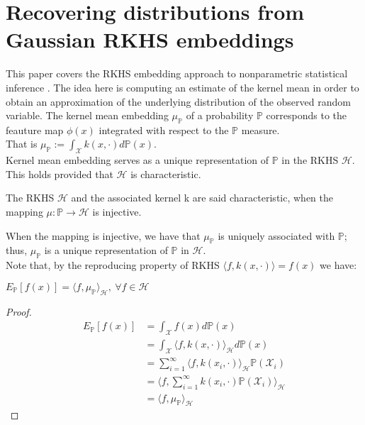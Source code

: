 \section{Recovering distributions from Gaussian RKHS embeddings}
This paper covers the RKHS embedding approach to nonparametric statistical inference \cite{pmlr}.
The idea here is computing an estimate of the kernel mean in order to obtain an approximation of the underlying distribution of the observed random variable.
The kernel mean embedding $\mu_{\mathbb{P}}$ of a probability $\mathbb{P}$ corresponds to the feauture map $\phi(x)$ integrated with respect to the $\mathbb{P}$ measure.
\\
That is $\mu_{\mathbb{P}}:=\int_{\mathcal{X}}k(x,\cdot)d\mathbb{P}(x)$.
\\
Kernel mean embedding serves as a unique representation of $\mathbb{P}$ in the RKHS $\mathcal{H}$. This holds provided  that $\mathcal{H}$ is characteristic. 
\begin{definition}
The RKHS $\mathcal{H}$ and the associated kernel k are said characteristic, when the mapping $\mu : \mathbb{P} \rightarrow \mathcal{H}$ is injective.
\end{definition}
When the mapping is injective, we have that $\mu_{\mathbb{P}}$ is uniquely associated with $\mathbb{P}$; thus, $\mu_{\mathbb{P}}$ is a unique representation of $\mathbb{P}$ in $\mathcal{H}$. 
\\
Note that, by the reproducing property of RKHS $\langle f, k(x,\cdot) \rangle=f(x)$ we have:
\\
\begin{center}
    $E_{\mathbb{P}}[f(x)]=\langle f,\mu_{\mathbb{P}} \rangle_{\mathcal{H}}, \ \forall f \in \mathcal{H}$
\end{center}

\begin{proof}   
\begin{align*}
E_{\mathbb{P}}[f(x)]&=\int_{\mathcal{X}} f(x) d\mathbb{P}(x)\\
&=\int_{\mathcal{X}} \langle f, k(x,\cdot) \rangle_{\mathcal{H}} d\mathbb{P}(x)\\
&= \sum_{i=1}^{\infty} \langle f, k(x_{i}, \cdot) \rangle_{\mathcal{H}} \mathbb{P}(\mathcal{X}_{i}) \\
&=\langle f, \sum_{i=1}^{\infty} k(x_{i}, \cdot)\mathbb{P}(\mathcal{X}_{i}) \rangle_{\mathcal{H}}\\
&=\langle f, \mu_{\mathbb{P}} \rangle_{\mathcal{H}}
\end{align*}
\end{proof}

